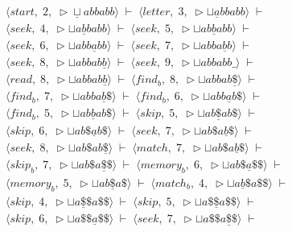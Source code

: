 \documentclass[14pt]{extarticle}
\begin{document}
\begin{align*}
    \langle start,\; 2,\; \triangleright\underline{\sqcup}abbabb \rangle \;\vdash\; \langle letter,\; 3,\; \triangleright\sqcup\underline{a}bbabb \rangle \;\vdash \\
    \langle seek,\; 4,\; \triangleright\sqcup a \underline{b}babb \rangle \;\vdash\; \langle seek,\; 5,\; \triangleright\sqcup ab\underline{b}abb \rangle \;\vdash \\
    \langle seek,\; 6,\; \triangleright\sqcup abb \underline{a}bb \rangle \;\vdash\; \langle seek,\; 7,\; \triangleright\sqcup abba\underline{b}b \rangle \;\vdash \\
    \langle seek,\; 8,\; \triangleright\sqcup abbab\underline{b} \rangle \;\vdash\; \langle seek,\; 9,\; \triangleright\sqcup abbabb\_\rangle \;\vdash \\
    \langle read,\; 8,\; \triangleright\sqcup abbab\underline{b} \rangle \;\vdash\; \langle find_b,\; 8,\; \triangleright\sqcup abbab\underline{\$} \rangle \;\vdash \\
    \langle find_b,\; 7,\; \triangleright\sqcup abba\underline{b}\$ \rangle \;\vdash\; \langle find_b,\; 6,\; \triangleright\sqcup abb\underline{a}b\$ \rangle \;\vdash \\
    \langle find_b,\; 5,\; \triangleright\sqcup ab\underline{b}ab\$ \rangle \;\vdash\; \langle skip,\; 5,\; \triangleright\sqcup ab\underline{\$}ab\$ \rangle \;\vdash \\
    \langle skip,\; 6,\; \triangleright\sqcup ab\$\underline{a}b\$ \rangle \;\vdash\; \langle seek,\; 7,\; \triangleright\sqcup ab\$a\underline{b}\$ \rangle \;\vdash \\
    \langle seek,\; 8,\; \triangleright\sqcup ab\$ab\underline{\$} \rangle \;\vdash\; \langle match,\; 7,\; \triangleright\sqcup ab\$a\underline{b}\$ \rangle \;\vdash \\
    \langle skip_b,\; 7,\; \triangleright\sqcup ab\$a\underline{\$}\$ \rangle \;\vdash\; \langle memory_b,\; 6,\; \triangleright\sqcup ab\$\underline{a}\$\$ \rangle \;\vdash \\
    \langle memory_b,\; 5,\; \triangleright\sqcup ab\underline{\$}a\$ \rangle \;\vdash\; \langle match_b,\; 4,\; \triangleright\sqcup a\underline{b}\$a\$\$ \rangle \;\vdash \\
    \langle skip,\; 4,\; \triangleright\sqcup a\underline{\$}\$a\$\$ \rangle \;\vdash\; \langle skip,\; 5,\; \triangleright\sqcup a\$\underline{\$}a\$\$ \rangle \;\vdash \\
    \langle skip,\; 6,\; \triangleright\sqcup a\$\$\underline{a}\$\$ \rangle \;\vdash\; \langle seek,\; 7,\; \triangleright\sqcup a\$\$a\underline{\$}\$ \rangle \;\vdash \\

\end{align*}
\end{document}
